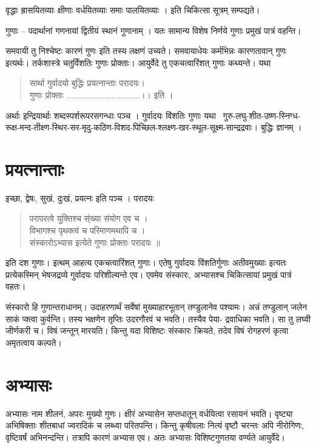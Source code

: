 वृद्धाः ह्रासयितव्याः क्षीणाः वर्धयितव्याः समाः पालयितव्याः । इति चिकित्सा सूत्रम् सम्पद्यते।

गुणाः – पदार्थानां गणनायां द्वितीयं स्थानं गुणानाम् । यतः सामान्य विशेष निर्णये गुणाः प्रमुखं पात्रं वहन्ति।

समवायी तु निश्चेष्टः कारणं गुणः इति तस्य लक्षणं उच्यते। समवायाधेयः कर्मभिन्नः कारणतावान् गुणः इत्यर्थः। तर्कशास्त्रे चतुर्विंशतिः गुणाः प्रोक्ताः। आयुर्वेदे तु एकचत्वारिंशत् गुणाः कथ्यन्ते। यथा 
\begin{verse}
सार्था गुर्वादयो बुद्धिः प्रयत्नान्ताः परादयः।\\
गुणाः प्रोक्ताः ...............................।। इति ।
\end{verse}
अर्थाः इन्द्रियार्थाः शब्दस्पर्शरूपरसगन्धाः पञ्च । गुर्वादयः विंशतिः गुणाः यथा \ गुरु-लघु-शीत-उष्ण-स्निग्ध- रूक्ष-मन्द-तीक्ष्ण-स्थिर-सर-मृदु-कठिण-विशद-पिच्छिल-श्लक्ष्ण-खर-स्थूल-सूक्ष्म-सान्द्रद्रवाः। बुद्धिः ज्ञानम् ।

\section*{प्रयत्नान्ताः}

इच्छा, द्वेषः, सुखं, दुःखं, प्रयत्नः इति पञ्च । परादयः \
\begin{verse}
परापरत्वे युक्तिश्च स्ंख्या संयोग एव च ।\\
विभागश्च पृथक्त्वं च परिमाणमथापि च ।\\
संस्कारोऽभ्यास इत्येते गुणाः प्रोक्ताः परादयः ॥
\end{verse}
इति दश गुणाः। इत्थम् आहत्य एकचत्वारिंशत् गुणाः। एतेषु गुर्वादयः विंशतिर्गुणाः अतीवमुख्याः इत्यतः प्रत्येकस्मिन् भेषजद्रव्ये गुर्वादयः परिशील्यन्ते एव। एवमेव संस्कारः, अभ्यासश्च चिकित्सायां प्रमुखं पात्रं वहतः।

संस्कारो हि गुणान्तराधानम्। उदाहरणार्थं सर्वेषां मुख्याहारभूतान् तण्डुलानेव पश्यामः। अन्नं तण्डुलान् जलेन साकं प्क्त्वा कुर्वन्ति। तस्य भक्षणेन तृप्तिः उदरगौरवं च भवति। तस्यैव पेया-  द्रवाधिका भवति। सा तु लघ्वी जीर्णकरी च। विषं जन्तून् मारयति। किन्तु यदा विशिष्टः संस्कारः क्रियते, तदेव विषं रोगहरणं कृत्वा अमृतत्वाय कल्पते।

\section*{अभ्यासः}

अभ्यासः नाम शीलनं, अपरः मुख्यो गुणः। क्षीरं अभ्यासेन सप्तधातून् वर्धयित्वा रसायनं भवति। वृष्ट्या अभिषिक्ताः शीतबाधां ज्वरादिकं च लब्ध्वा परितपन्ति। किन्तु कृषीवलाः नित्यं वृष्टौ चरन्तः अपि नीरोगिणः, वृष्टिवर्षं अभिनन्दन्ति। तत्रापि कारणं अभ्यास एव। अतः अभ्यासः विशिष्टगुणतया वर्ण्यते आयुर्वेदे।

